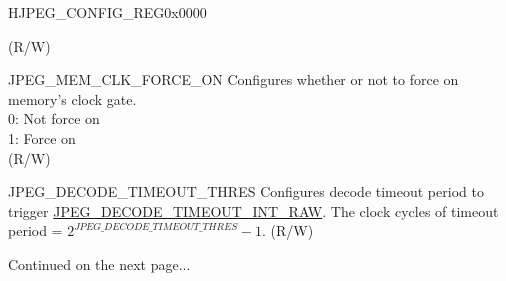 \begin{register}{H}{JPEG\_CONFIG\_REG}{0x0000}
\begin{regdesc}
\begin{reglist}
(R/W)
\label{fielddesc:JPEGMEMCLKFORCEON}\item [JPEG\_MEM\_CLK\_FORCE\_ON] Configures whether or not to force on memory's clock gate.\\
0: Not force on\\
1: Force on\\
(R/W)
\label{fielddesc:JPEGDECODETIMEOUTTHRES}\item [JPEG\_DECODE\_TIMEOUT\_THRES] Configures decode timeout period to trigger \hyperref[fielddesc:JPEGDECODETIMEOUTINTRAW]{JPEG\_DECODE\_TIMEOUT\_INT\_RAW}. The clock cycles of timeout period = $ 2 ^ {JPEG\_DECODE\_TIMEOUT\_THRES} - 1 $.  (R/W)

\item [Continued on the next page...]
\end{reglist}\end{regdesc}
\end{register}

